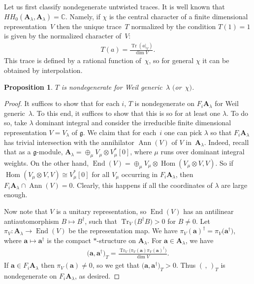 \documentclass[pdftex]{sigma}
\numberwithin{equation}{section}
\newtheorem{Proposition}[Theorem]{Proposition}
\newcommand{\g}{\mathfrak{g}}
\begin{document}
Let us first classify nondegenerate untwisted traces. It is well known that $HH_0({\mathbf A}_\lambda,{\mathbf A}_\lambda)={\mathbb C}$. Namely, if $\chi$ is the central character of a finite dimensional representation~$V$ then the unique trace~$T$ normalized by the condition $T(1)=1$ is given by the normalized character of~$V$:
\begin{gather*}
T(a)=\frac{\operatorname{Tr}(a|_V)}{\dim V}.
\end{gather*}
This trace is defined by a rational function of~$\chi$, so for general $\chi$ it can be obtained by interpolation.

\begin{Proposition}\label{nondeLie} $T$ is nondegenerate for Weil generic~$\lambda$ $($or~$\chi)$.
\end{Proposition}

\begin{proof} It suffices to show that for each $i$, $T$ is nondegenerate on $F_i{\mathbf A}_\lambda$ for Weil generic~$\lambda$. To this end, it suffices to show that this is so for at least one $\lambda$. To do so, take $\lambda$ dominant integral and consider the irreducible finite dimensional representation $V=V_\lambda$ of $\g$. We claim that for each~$i$ one can pick $\lambda$ so that $F_i{\mathbf A}_\lambda$ has trivial intersection with the annihilator $\operatorname{Ann}(V)$ of $V$ in~${\mathbf A}_\lambda$. Indeed, recall that as a $\g$-module, ${\mathbf A}_\lambda=\oplus_\mu V_\mu\otimes V_\mu^*[0]$, where $\mu$ runs over dominant integral weights. On the other hand, $\operatorname{End}(V)=\oplus_\mu V_\mu\otimes \operatorname{Hom}(V_\mu\otimes V,V)$. So if $\operatorname{Hom}(V_\mu\otimes V,V)\cong V_\mu^*[0]$ for all $V_\mu$ occurring in $F_i{\mathbf A}_\lambda$, then $F_i{\mathbf A}_\lambda\cap \operatorname{Ann}(V)=0$. Clearly, this happens if all the coordinates of $\lambda$ are large enough.

Now note that $V$ is a unitary representation, so $\operatorname{End}(V)$ has an antilinear antiautomorphism
$B\mapsto B^\dagger$, such that $\operatorname{Tr}_V\big(B^\dagger B\big)>0$ for $B\ne 0$. Let $\pi_V\colon {\mathbf A}_\lambda\to \operatorname{End}(V)$ be the representation map. We have $\pi_V({\mathbf a})^\dagger=\pi_V\big({\mathbf a}^\dagger\big)$, where ${\mathbf a}\mapsto {\mathbf a}^\dagger$ is the compact $*$-structure on ${\mathbf A}_\lambda$. For ${\mathbf a}\in {\mathbf A}_\lambda$, we have
\begin{gather*}
\big({\mathbf a},{\mathbf a}^\dagger\big)_T=\frac{\operatorname{Tr}_V\big(\pi_V({\mathbf a})\pi_V({\mathbf a})^\dagger\big)}{\dim V}.
\end{gather*}
If ${\mathbf a}\in F_i{\mathbf A}_\lambda$ then $\pi_V({\mathbf a})\ne 0$, so we get that $\big({\mathbf a},{\mathbf a}^\dagger\big)_T>0$. Thus $(\,,\,)_T$ is nondegenerate on $F_i{\mathbf A}_\lambda$, as desired.
\end{proof}
\end{document}
